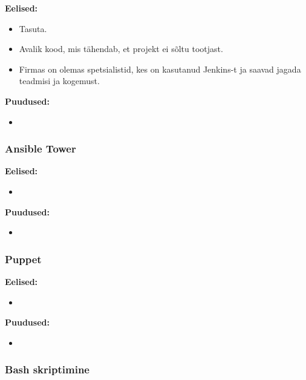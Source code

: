 \documentclass[12pt]{report}
\begin{document}
  \textbf{Eelised:}
  \begin{itemize}
    \item Tasuta.
    \item Avalik kood, mis tähendab, et projekt ei sõltu tootjast.
    \item Firmas on olemas spetsialistid, kes on kasutanud Jenkins-t ja saavad jagada teadmisi ja kogemust.
  \end{itemize}
  
  \textbf{Puudused:}
  \begin{itemize}
    \item 
  \end{itemize}
  
  \subsubsection{Ansible Tower \cite{ansible}}
  
  \textbf{Eelised:}
  \begin{itemize}
    \item 
  \end{itemize}
  
  \textbf{Puudused:}
  \begin{itemize}
    \item
  \end{itemize}
  
  \subsubsection{Puppet \cite{puppet}}
  
  \textbf{Eelised:}
  \begin{itemize}
    \item
  \end{itemize}
  
  \textbf{Puudused:}
  \begin{itemize}
    \item 
  \end{itemize}

  \subsubsection{Bash skriptimine \cite{bash}}
  
\end{document}
